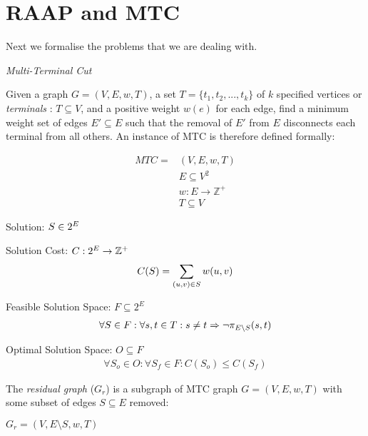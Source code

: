 \section{RAAP and MTC}

Next we formalise the problems that we are dealing with.

\begin{definition}
{\em Multi-Terminal Cut}

Given a graph $G=(V,E,w,T)$, a set $T=\{t_1, t_2, ..., t_k\}$ of $k$ specified vertices or {\em terminals} : $T \subseteq V$, and a positive weight $w(e)$ for each edge, find a minimum weight set of edges $E' \subseteq E$ such that the removal of $E'$ from $E$ disconnects each terminal from all others.
An instance of MTC is therefore defined formally:

\begin{align}
	\nonumber MTC = & (V,E,w,T)\\
	\nonumber & E \subseteq V^2\\
	\nonumber & w : E \rightarrow \mathbb{Z}^+\\
	\nonumber & T \subseteq V
\end{align}

Solution: $S \in 2^E$

Solution Cost: $C : 2^E \rightarrow \mathbb{Z}^+$
\begin{align}
	\nonumber C(S) = \displaystyle\sum\limits_{(u,v) \in S} w(u,v)
\end{align}

Feasible Solution Space: $F \subseteq 2^E$
\begin{align}
	\nonumber \forall S \in F : \forall s, t \in T: s \neq t \Rightarrow \neg\pi_{E \setminus S}(s, t)
\end{align}

Optimal Solution Space: $O \subseteq F$
\begin{align}
	\forall S_o \in O : \forall S_f \in F : \nonumber C(S_o) \leq C(S_f)
\end{align}

\end{definition}

\begin{definition}
The {\em residual graph} ($G_r$) is a subgraph of MTC graph $G=(V,E,w,T)$ with some subset of edges $S \subseteq E$ removed:

$G_r = (V, E \setminus S, w, T)$
\end{definition}


